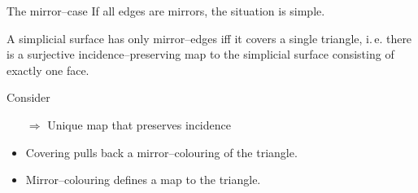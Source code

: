 \begin{frame}{The mirror--case}
    \pause
    If all edges are mirrors, the situation is simple.
    \pause
    \begin{lem}
        A simplicial surface has only mirror--edges iff it covers a 
        single triangle\pause, i.\,e. there is a surjective incidence--preserving
        map \pause to the simplicial surface consisting of exactly one face.
    \end{lem}
    \pause
    Consider
        \begin{center}
        \end{center}
    \begin{itemize}
        \pause
        \item[$\Rightarrow$] Unique map that preserves incidence
        \pause
        \item Covering pulls back a mirror--colouring of the triangle.
        \pause
        \item Mirror--colouring defines a map to the triangle.
    \end{itemize}
\end{frame}


